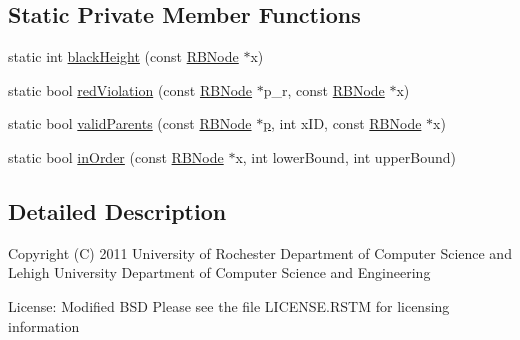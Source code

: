 \subsection*{Static Private Member Functions}
\begin{DoxyCompactItemize}
\item 
static int \hyperlink{classRBTree_af39dd046b37c778075465a6aab1a651b}{black\-Height} (const \hyperlink{structRBTree_1_1RBNode}{R\-B\-Node} $\ast$x)
\item 
static bool \hyperlink{classRBTree_a1801138c09038db3b50b15047a2ca661}{red\-Violation} (const \hyperlink{structRBTree_1_1RBNode}{R\-B\-Node} $\ast$p\-\_\-r, const \hyperlink{structRBTree_1_1RBNode}{R\-B\-Node} $\ast$x)
\item 
static bool \hyperlink{classRBTree_a95f426ead99aebb5add85206e36f694e}{valid\-Parents} (const \hyperlink{structRBTree_1_1RBNode}{R\-B\-Node} $\ast$\hyperlink{counted__ptr_8hpp_a5c9f59d7c24e3fd6ceae319a968fc3e0}{p}, int x\-I\-D, const \hyperlink{structRBTree_1_1RBNode}{R\-B\-Node} $\ast$x)
\item 
static bool \hyperlink{classRBTree_a277a28c2007dd04dda0971a577e6e9ae}{in\-Order} (const \hyperlink{structRBTree_1_1RBNode}{R\-B\-Node} $\ast$x, int lower\-Bound, int upper\-Bound)
\end{DoxyCompactItemize}


\subsection{Detailed Description}
Copyright (C) 2011 University of Rochester Department of Computer Science and Lehigh University Department of Computer Science and Engineering

License\-: Modified B\-S\-D Please see the file L\-I\-C\-E\-N\-S\-E.\-R\-S\-T\-M for licensing information 

